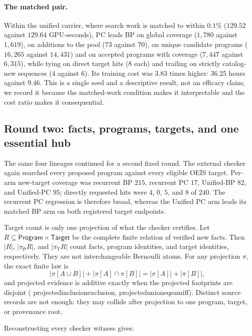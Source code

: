 \documentclass[11pt]{article}
\newcommand{\leanname}[1]{{\scriptsize\ttfamily
  \def\_{\textunderscore\allowbreak}#1}}
\begin{document}
\paragraph{The matched pair.}
Within the unified carrier, where search work is matched to within $0.1\%$
($129.52$ against $129.64$ GPU-seconds), PC leads BP on global coverage
($1{,}780$ against $1{,}619$), on additions to the pool ($73$ against $70$), on unique
candidate programs ($16{,}265$ against $14{,}431$) and on accepted programs with
coverage ($7{,}447$ against $6{,}315$), while tying on direct target hits ($8$ each) and
trailing on strictly catalog-new sequences ($4$ against $6$). Its training cost was
$3.83$ times higher: $36.25$ hours against $9.46$. This is a single seed and a
descriptive result, not an efficacy claim; we record it because the matched-work
condition makes it interpretable and the cost ratio makes it consequential.

\subsection{Round two: facts, programs, targets, and one essential hub}
\label{sec:fresh-round-two-relational}

The same four lineages continued for a second fixed round. The external checker again
searched every proposed program against every eligible OEIS target. Per-arm new-target
coverage was recurrent BP $215$, recurrent PC $17$, Unified-BP $82$, and Unified-PC
$95$; directly requested hits were $4$, $0$, $5$, and $8$ of $240$. The recurrent
PC regression is therefore broad, whereas the Unified PC arm leads its matched BP arm
on both registered target endpoints.

Target count is only one projection of what the checker certifies. Let
$R\subseteq\mathsf{Program}\times\mathsf{Target}$ be the complete finite relation of
verified new facts. Then $|R|$, $|\pi_{\mathsf P}R|$, and
$|\pi_{\mathsf T}R|$ count facts, program identities, and target identities,
respectively. They are not interchangeable Bernoulli atoms. For any projection $\pi$,
the exact finite law is
\[
 |\pi[A\cup B]|+|\pi[A]\cap\pi[B]|=|\pi[A]|+|\pi[B]|,
\]
and projected evidence is additive exactly when the projected footprints are disjoint
(\leanname{projected\_inclusion\_exclusion},
\leanname{projected\_union\_eq\_sum\_iff}). Distinct source records are not enough:
they may collide after projection to one program, target, or provenance root.

Reconstructing every checker witness gives:
\end{document}
